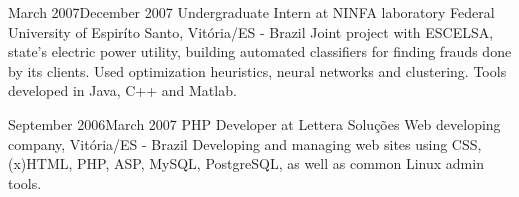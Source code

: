 \documentclass{friggeri-cv}
\begin{document}
\workentry
  {March 2007}{December 2007}
  {Undergraduate Intern at NINFA laboratory}
  {Federal University of Espiríto Santo, Vitória/ES - Brazil}
  {Joint project with ESCELSA, state's electric power utility, building automated classifiers
  for finding frauds done by its clients. Used optimization heuristics, neural networks and clustering.
  Tools developed in Java, C++ and Matlab.}

\workentry
  {September 2006}{March 2007}
  {PHP Developer at Lettera Soluções}
  {Web developing company, Vitória/ES - Brazil}
  {Developing and managing web sites using CSS, (x)HTML, PHP, ASP, MySQL, PostgreSQL, as well as common Linux admin tools.}

\end{document}
